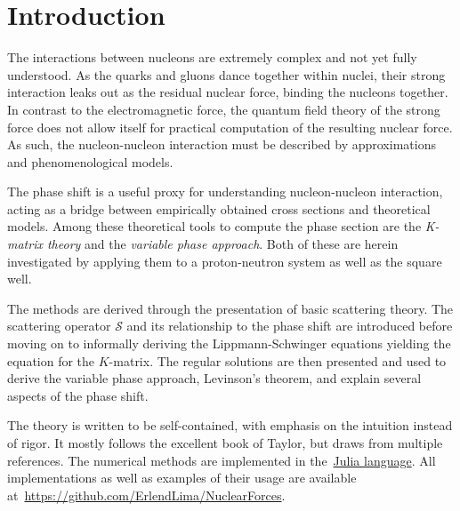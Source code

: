 \section{Introduction}
The interactions between nucleons are extremely complex and not yet fully
understood. As the quarks and gluons dance together within nuclei, their
strong interaction leaks out as the residual nuclear force, binding the nucleons
together.  In contrast to the electromagnetic force, the quantum field theory of the
strong force does not allow itself for practical computation of the resulting
nuclear force. As such, the nucleon-nucleon interaction must be described by
approximations and phenomenological models.

The phase shift is a useful proxy for understanding nucleon-nucleon interaction,
acting as a bridge between empirically obtained cross sections and theoretical
models.
Among these theoretical tools to compute the phase section are the \textit{K-matrix theory} and the \textit{variable
  phase approach}. Both of these are herein investigated by applying them
to a proton-neutron system as well as the square well.

The methods are derived through the
presentation of basic scattering theory. The scattering operator \(\mathcal{S}\) and
its relationship to the phase shift are introduced before moving on to informally
deriving the Lippmann-Schwinger equations yielding the equation for the
\(K\)-matrix. The regular solutions are then presented and used
to derive the variable phase approach, Levinson's theorem, and explain several aspects of the phase shift.

The theory is written to be self-contained, with emphasis on the intuition
instead of rigor. It mostly follows the excellent book of Taylor\cite{taylor},
but draws from multiple references. The numerical methods are implemented in
the~\href{https://julialang.org/}{Julia language}. All implementations as well
as examples of their usage are available at~\url{https://github.com/ErlendLima/NuclearForces}.



